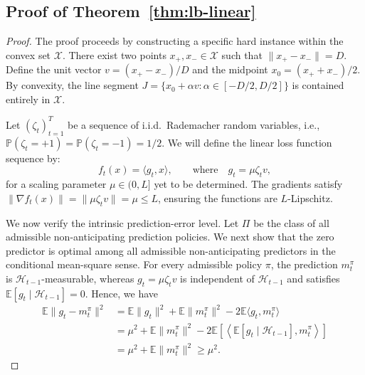 \documentclass[journal,onecolumn]{IEEEtran}
\newcommand{\cX}{\mathcal{X}}
\theoremstyle{plain}
\theoremstyle{definition}
\theoremstyle{remark}
\begin{document}
{\subsection{Proof of Theorem~\ref{thm:lb-linear}}

\begin{proof}
The proof proceeds by constructing a specific hard instance within the convex set $\cX$.
There exist two points $x_+, x_- \in \cX$ such that $\|x_+ - x_-\| = D$.
Define the unit vector $v= (x_+ - x_-)/D$ and the midpoint $x_0 = (x_+ + x_-)/2$.
By convexity, the line segment $J = \{x_0 + \alpha v : \alpha \in [-D/2, D/2]\}$ is contained entirely in $\cX$.


Let $(\zeta_t)_{t=1}^T$ be a sequence of i.i.d.\ Rademacher random variables, i.e., $\mathbb{P}(\zeta_t = +1) = \mathbb{P}(\zeta_t = -1) = 1/2$. 
We will define the linear loss function sequence by:
\begin{equation*}
f_t(x) = \langle g_t, x\rangle, \qquad \text{where} \quad g_t = \mu \zeta_t v,
\end{equation*}
for a scaling parameter $\mu \in (0, L]$ yet to be determined. The gradients satisfy $\|\nabla f_t(x)\| = \|\mu \zeta_t v\| = \mu \le L$, ensuring the functions are $L$-Lipschitz.

We now verify the intrinsic prediction-error level. Let $\Pi$ be the class of all
admissible non-anticipating prediction policies. We next show that the zero predictor is optimal among all admissible
non-anticipating predictors in the conditional mean-square sense. For every
admissible policy $\pi$, the prediction $m_t^\pi$ is $\mathcal H_{t-1}$-measurable,
whereas $g_t=\mu\zeta_t v$ is independent of $\mathcal H_{t-1}$ and satisfies
$\mathbb E[g_t\mid\mathcal H_{t-1}]=0$. Hence, we have
\begin{align}
    \mathbb E\|g_t-m_t^\pi\|^2
    &=
    \mathbb E\|g_t\|^2
    +
    \mathbb E\|m_t^\pi\|^2
    -
    2\mathbb E\langle g_t,m_t^\pi\rangle \nonumber \\
    &=
    \mu^2
    +
    \mathbb E\|m_t^\pi\|^2
    -
    2\mathbb E\left[
        \left\langle
            \mathbb E[g_t\mid\mathcal H_{t-1}],
            m_t^\pi
        \right\rangle
    \right] \nonumber \\
    &=
    \mu^2+\mathbb E\|m_t^\pi\|^2
    \ge
    \mu^2\label{eq:expectation_lower}.
\end{align}


\end{proof}}
\end{document}

